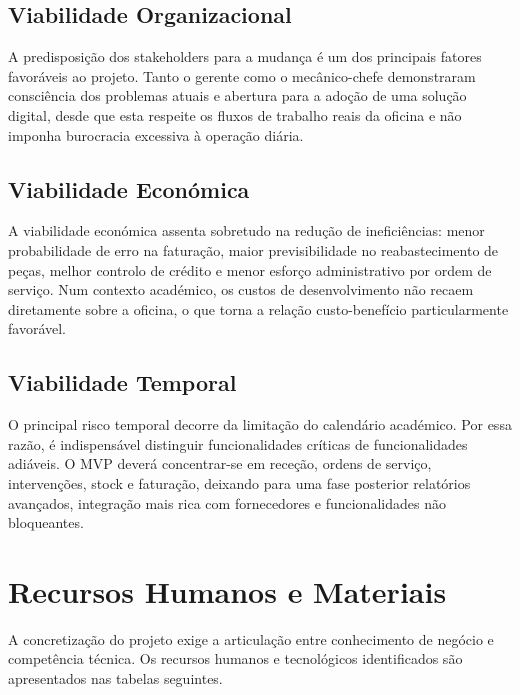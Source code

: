 \documentclass[a4paper,12pt]{scrreprt}
\begin{document}
        \subsection{Viabilidade Organizacional}
        A predisposição dos stakeholders para a mudança é um dos principais fatores favoráveis ao projeto. Tanto o gerente como o mecânico-chefe demonstraram consciência dos problemas atuais e abertura para a adoção de uma solução digital, desde que esta respeite os fluxos de trabalho reais da oficina e não imponha burocracia excessiva à operação diária.

        \subsection{Viabilidade Económica}
        A viabilidade económica assenta sobretudo na redução de ineficiências: menor probabilidade de erro na faturação, maior previsibilidade no reabastecimento de peças, melhor controlo de crédito e menor esforço administrativo por ordem de serviço. Num contexto académico, os custos de desenvolvimento não recaem diretamente sobre a oficina, o que torna a relação custo-benefício particularmente favorável.

        \subsection{Viabilidade Temporal}
        O principal risco temporal decorre da limitação do calendário académico. Por essa razão, é indispensável distinguir funcionalidades críticas de funcionalidades adiáveis. O MVP deverá concentrar-se em receção, ordens de serviço, intervenções, stock e faturação, deixando para uma fase posterior relatórios avançados, integração mais rica com fornecedores e funcionalidades não bloqueantes.

    \section{Recursos Humanos e Materiais}
        A concretização do projeto exige a articulação entre conhecimento de negócio e competência técnica. Os recursos humanos e tecnológicos identificados são apresentados nas tabelas seguintes.
\end{document}
